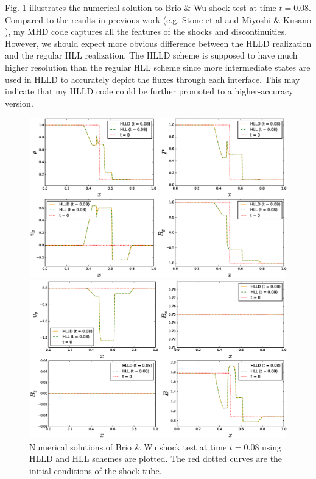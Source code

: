\documentclass[10.5pt]{article}
\begin{document}
Fig. \ref{fig: BW shock test} illustrates the numerical solution to Brio \& Wu shock test 
at time $t=0.08$. 
Compared to the results in previous work (e.g. Stone et al \cite{stone2008athena} and 
Miyoshi \& Kusano \cite{miyoshi2005multi}), my MHD code captures all the features 
of the shocks and discontinuities. However, we should expect more obvious difference between 
the HLLD realization and the regular HLL realization. The HLLD scheme is supposed to 
have much higher resolution than the regular HLL scheme since more intermediate 
states are used in HLLD to accurately depict the fluxes through each interface. This may 
indicate that my HLLD code could be further promoted to a higher-accuracy version.
\begin{figure}[ht]
	\centering
	\begin{minipage}[c]{0.9\textwidth}
		\includegraphics[width=1\textwidth]{BW1.eps}
	\end{minipage}
	\begin{minipage}[c]{0.9\textwidth}
		\includegraphics[width=1\textwidth]{BW2.eps}
	\end{minipage}%
\caption{Numerical solutions of Brio \& Wu shock test at time $t=0.08$ using HLLD and HLL 
schemes are plotted. The red dotted curves are the initial conditions of the shock tube.}
\label{fig: BW shock test}
\end{figure}
\end{document}
